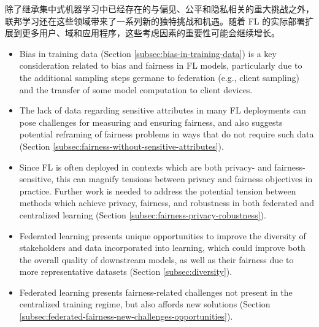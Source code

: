 除了继承集中式机器学习中已经存在的与偏见、公平和隐私相关的重大挑战之外，联邦学习还在这些领域带来了一系列新的独特挑战和机遇。随着 FL 的实际部署扩展到更多用户、域和应用程序，这些考虑因素的重要性可能会继续增长。

\begin{itemize}
    \item Bias in training data (Section \ref{subsec:bias-in-training-data}) is a key consideration related to bias and fairness in FL models, particularly due to the additional sampling steps germane to federation (e.g., client sampling) and the transfer of some model computation to client devices.
    \item The lack of data regarding sensitive attributes in many FL deployments can pose challenges for measuring and ensuring fairness, and also suggests potential reframing of fairness problems in ways that do not require such data (Section \ref{subsec:fairness-without-sensitive-attributes}).
    \item Since FL is often deployed in contexts which are both privacy- and fairness-sensitive, this can magnify tensions between privacy and fairness objectives in practice. Further work is needed to address the potential tension between methods which achieve privacy, fairness, and robustness in both federated and centralized learning (Section \ref{subsec:fairness-privacy-robustness}).
    \item Federated learning presents unique opportunities to improve the diversity of stakeholders and data incorporated into learning, which could improve both the overall quality of downstream models, as well as their fairness due to more representative datasets (Section \ref{subsec:diversity}).
    \item Federated learning presents fairness-related challenges not present in the centralized training regime, but also affords new solutions (Section \ref{subsec:federated-fairness-new-challenges-opportunities}).
\end{itemize}


